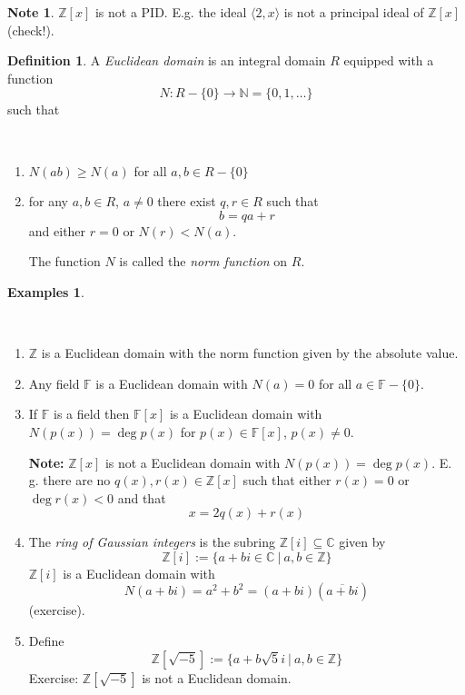 \documentclass[12pt, letterpaper, oneside]{article}
\theoremstyle{plain}
\theoremstyle{definition}
\newtheorem{definition}[theorem]{Definition}
\newtheorem{examples}[theorem]{Examples}
\newtheorem{note}[theorem]{Note}
\newcommand{\lra}{\longrightarrow}
\newcommand{\N}{{\mathbb N}}
\newcommand{\Z}{{\mathbb Z}}
\newcommand{\C}{{\mathbb C}}
\newcommand{\F}{{\mathbb F}}
\newcommand{\subgp}[1]{\langle#1\rangle}
\newcommand{\benu}{\begin{enumerate}}
\newcommand{\eenu}{\end{enumerate}}
\newcommand{\vs}{\vskip 5mm}
\newcommand{\isep}[1][0]{\setlength{\itemsep}{#1 mm}}
\begin{document}
\vs\vs

\begin{note}
$\Z[x]$ is not a PID. E.g. the ideal $\subgp{2, x}$ is not a principal ideal of $\Z[x]$ (check!).
\end{note}

\vs\vs

\begin{definition}
A \emph{Euclidean domain} is an integral domain $R$ equipped with a function
$$N \colon R-\{0\} \lra \N = \{ 0, 1,  \dots \}$$
such that 

\vskip -14mm

\ 
\benu
\isep[0]
\item $N(ab) \geq N(a) $  for all $a, b \in R - \{0\}$
\item for any  $a, b \in R$, $a\neq 0$ there exist $q, r\in R$ such that 
$$b = qa + r$$
and either $r= 0$ or $N(r)<  N(a)$.

The function $N$ is called the \emph{norm function} on $R$.
\eenu
\end{definition}

\vs\vs

\begin{examples}\ 

\vskip -13mm

\ 
\benu
\isep[5]
\item $\Z$ is a Euclidean domain with the norm function given by the absolute value.

\item Any field $\F$ is a Euclidean domain with $N(a) = 0$ for all $a\in \F- \{0\}$.

\item If $\F$ is a field then  $\F[x]$ is a Euclidean domain with $N(p(x)) = \deg p(x)$
for $p(x)\in \F[x]$, $p(x)\neq 0$.

\vs

\textbf{Note:} $\Z[x]$ is not a Euclidean domain with $N(p(x)) = \deg p(x)$. E. g. there are no
$q(x), r(x)\in \Z[x]$ such that either $r(x)=0$ or $\deg r(x) < 0$ and that 
$$x = 2q(x) + r(x)$$



\item The \emph{ring of Gaussian integers} is the subring $\Z[i]\subseteq \C$ given by 
$$\Z[i] :=\{a + bi \in \C \ | \ a, b\in \Z \}$$
$\Z[i]$ is a Euclidean domain with 
$$N(a+bi) = a^{2}+b^{2} = (a+bi)(\overline{a+bi})$$
(exercise).

\item Define
$$\Z[\sqrt{-5}] := \{ a + b\sqrt{5}i \ | \  a, b\in \Z \}$$
Exercise: $\Z[\sqrt{-5}]$ is not a Euclidean domain.  
\eenu

\end{examples}
\end{document}
